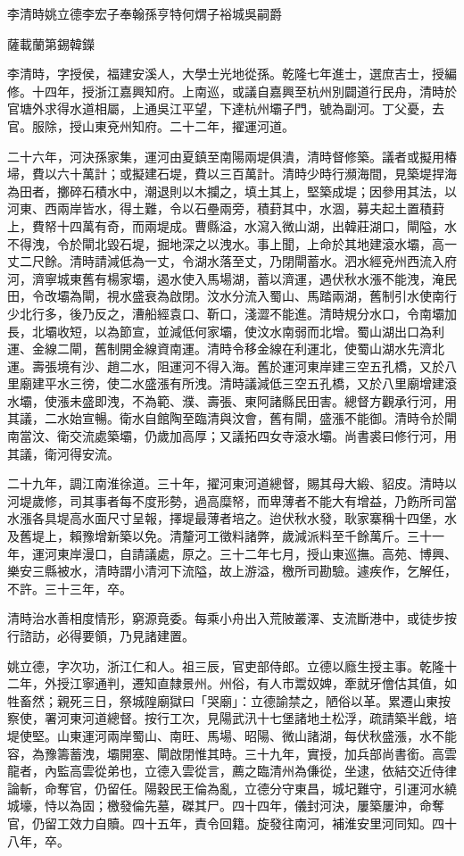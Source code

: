 
\begin{pinyinscope}
李清時姚立德李宏子奉翰孫亨特何煟子裕城吳嗣爵

薩載蘭第錫韓鑅

李清時，字授侯，福建安溪人，大學士光地從孫。乾隆七年進士，選庶吉士，授編修。十四年，授浙江嘉興知府。上南巡，或議自嘉興至杭州別闢道行民舟，清時於官塘外求得水道相屬，上通吳江平望，下達杭州壩子門，號為副河。丁父憂，去官。服除，授山東兗州知府。二十二年，擢運河道。

二十六年，河決孫家集，運河由夏鎮至南陽兩堤俱潰，清時督修築。議者或擬用椿埽，費以六十萬計；或擬建石堤，費以三百萬計。清時少時行瀕海間，見築堤捍海為田者，擲碎石積水中，潮退則以木攔之，填土其上，堅築成堤；因參用其法，以河東、西兩岸皆水，得土難，令以石壘兩旁，積葑其中，水涸，募夫起土置積葑上，費帑十四萬有奇，而兩堤成。曹縣溢，水瀉入微山湖，出韓莊湖口，閘隘，水不得洩，令於閘北毀石堤，掘地深之以洩水。事上聞，上命於其地建滾水壩，高一丈二尺餘。清時請減低為一丈，令湖水落至丈，乃閉閘蓄水。泗水經兗州西流入府河，濟寧城東舊有楊家壩，遏水使入馬場湖，蓄以濟運，遇伏秋水漲不能洩，淹民田，令改壩為閘，視水盛衰為啟閉。汶水分流入蜀山、馬踏兩湖，舊制引水使南行少北行多，後乃反之，漕船經袁口、靳口，淺澀不能進。清時規分水口，令南壩加長，北壩收短，以為節宣，並減低何家壩，使汶水南弱而北增。蜀山湖出口為利運、金線二閘，舊制開金線資南運。清時令移金線在利運北，使蜀山湖水先濟北運。壽張境有沙、趙二水，阻運河不得入海。舊於運河東岸建三空五孔橋，又於八里廟建平水三徬，使二水盛漲有所洩。清時議減低三空五孔橋，又於八里廟增建滾水壩，使漲未盛即洩，不為範、濮、壽張、東阿諸縣民田害。總督方觀承行河，用其議，二水始宣暢。衛水自館陶至臨清與汶會，舊有閘，盛漲不能御。清時令於閘南當汶、衛交流處築壩，仍歲加高厚；又議拓四女寺滾水壩。尚書裘曰修行河，用其議，衛河得安流。

二十九年，調江南淮徐道。三十年，擢河東河道總督，賜其母大緞、貂皮。清時以河堤歲修，司其事者每不度形勢，過高糜帑，而卑薄者不能大有增益，乃飭所司當水漲各具堤高水面尺寸呈報，擇堤最薄者培之。迨伏秋水發，耿家寨稱十四堡，水及舊堤上，賴豫增新築以免。清釐河工徵料諸弊，歲減派料至千餘萬斤。三十一年，運河東岸漫口，自請議處，原之。三十二年七月，授山東巡撫。高苑、博興、樂安三縣被水，清時謂小清河下流隘，故上游溢，檄所司勘驗。遽疾作，乞解任，不許。三十三年，卒。

清時治水善相度情形，窮源竟委。每乘小舟出入荒陂叢澤、支流斷港中，或徒步按行諮訪，必得要領，乃見諸建置。

姚立德，字次功，浙江仁和人。祖三辰，官吏部侍郎。立德以廕生授主事。乾隆十二年，外授江寧通判，遷知直隸景州。州俗，有人市鬻奴婢，牽就牙儈估其值，如牲畜然；親死三日，祭城隍廟獄曰「哭廟」：立德諭禁之，陋俗以革。累遷山東按察使，署河東河道總督。按行工次，見陽武汛十七堡諸地土松浮，疏請築半戧，培堤使堅。山東運河兩岸蜀山、南旺、馬場、昭陽、微山諸湖，每伏秋盛漲，水不能容，為豫籌蓄洩，壩開塞、閘啟閉惟其時。三十九年，實授，加兵部尚書銜。高雲龍者，內監高雲從弟也，立德入雲從言，薦之臨清州為傔從，坐逮，依結交近侍律論斬，命奪官，仍留任。陽穀民王倫為亂，立德分守東昌，城圮難守，引運河水繞城壕，恃以為固；檄發倫先墓，磔其尸。四十四年，儀封河決，屢築屢沖，命奪官，仍留工效力自贖。四十五年，責令回籍。旋發往南河，補淮安里河同知。四十八年，卒。


\end{pinyinscope}
